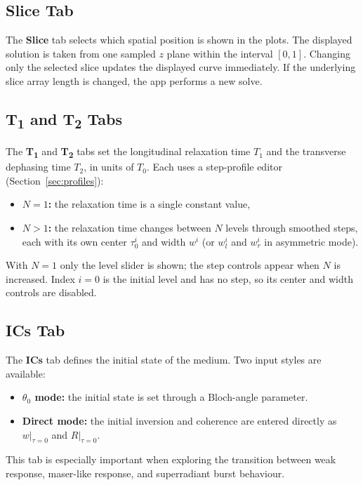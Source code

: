 \documentclass[12pt,a4paper]{article}
\newcommand{\tab}[1]{\textbf{#1}}
\begin{document}
\subsection{Slice Tab}

The \tab{Slice} tab selects which spatial position is shown in the plots.
The displayed solution is taken from one sampled $z$ plane within the interval $[0,1]$.
Changing only the selected slice updates the displayed curve immediately. If the underlying slice array
length is changed, the app performs a new solve.

\subsection{T\textsubscript{1} and T\textsubscript{2} Tabs}

The \tab{T\textsubscript{1}} and \tab{T\textsubscript{2}} tabs set the
longitudinal relaxation time $T_1$ and the transverse dephasing time $T_2$,
in units of $T_0$. Each uses a step-profile editor
(Section~\ref{sec:profiles}):
\begin{itemize}[noitemsep]
  \item \textbf{$N = 1$:} the relaxation time is a single constant value,
  \item \textbf{$N > 1$:} the relaxation time changes between $N$ levels
  through smoothed steps, each with its own center $\tau_0^i$ and width $w^i$
  (or $w_l^i$ and $w_r^i$ in asymmetric mode).
\end{itemize}
With $N = 1$ only the level slider is shown; the step controls appear when
$N$ is increased. Index $i = 0$ is the initial level and has no step, so
its center and width controls are disabled.

\subsection{ICs Tab}

The \tab{ICs} tab defines the initial state of the medium. Two input styles are available:
\begin{itemize}[noitemsep]
  \item \textbf{$\theta_0$ mode:} the initial state is set through a Bloch-angle parameter.
  \item \textbf{Direct mode:} the initial inversion and coherence are entered directly as $w\vert_{\tau=0}$ and $R\vert_{\tau=0}$.
\end{itemize}

This tab is especially important when exploring the transition between weak response, maser-like response,
and superradiant burst behaviour.
\end{document}
